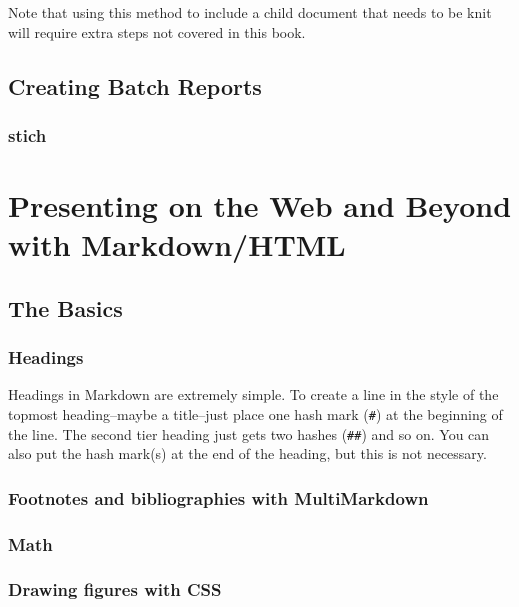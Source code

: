 \documentclass[ChapterTOCs,krantz1]{krantz}\usepackage{graphicx, color}
\begin{document}
{{\noindent Note that using this method to include a child document that needs to be knit will require extra steps not covered in this book.


\section{Creating Batch Reports}

\subsection{stich}




\chapter{Presenting on the Web and Beyond with Markdown/HTML}

\section{The Basics}

\subsection{Headings}

Headings in Markdown are extremely simple. To create a line in the style
of the topmost heading--maybe a title--just place one hash mark
(\texttt{\#}) at the beginning of the line. The second tier heading just
gets two hashes (\texttt{\#\#}) and so on. You can also put the hash
mark(s) at the end of the heading, but this is not necessary.

\subsection{Footnotes and bibliographies with MultiMarkdown}

\subsection{Math}

\subsection{Drawing figures with CSS}

}}
\end{document}
